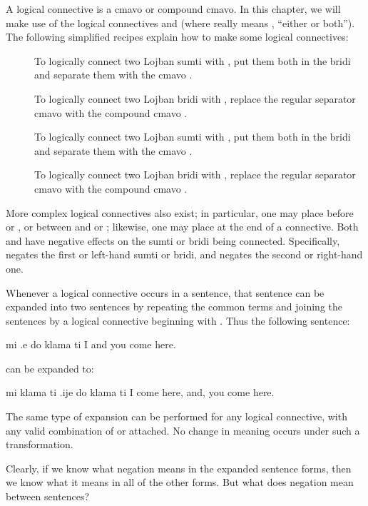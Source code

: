 A logical connective is a cmavo or compound cmavo. In this
    chapter, we will make use of the logical connectives 
    and  (where  really means , ``either or
    both''). The following simplified recipes explain how to make
    some logical connectives:
\begin{description}
\item[] To logically connect two Lojban sumti with , put them both in the bridi and separate them with the cmavo .
\item[] To logically connect two Lojban bridi with , replace the regular separator cmavo  with the compound cmavo .
\item[] To logically connect two Lojban sumti with , put them both in the bridi and separate them with the cmavo .
\item[] To logically connect two Lojban bridi with , replace the regular separator cmavo  with the compound cmavo .

\end{description}

More complex logical connectives also exist; in particular,
    one may place  before  or , or between 
    and  or ; likewise, one may place  at the
    end of a connective. Both  and  have negative
    effects on the sumti or bridi being connected. Specifically,
     negates the first or left-hand sumti or bridi, and
     negates the second or right-hand one.

Whenever a logical connective occurs in a sentence, that
    sentence can be expanded into two sentences by repeating the
    common terms and joining the sentences by a logical connective
    beginning with . Thus the following sentence:
\begin{example}
mi .e do klama ti\n
I and you come here.
\end{example}

{\noindent}can be expanded to:
\begin{example}
mi klama ti  .ije do klama ti\n
I come here, and, you come here.
\end{example}

The same type of expansion can be performed for any logical
    connective, with any valid combination of  or 
    attached. No change in meaning occurs under such a
    transformation.

Clearly, if we know what negation means in the expanded
    sentence forms, then we know what it means in all of the other
    forms. But what does negation mean between sentences?

